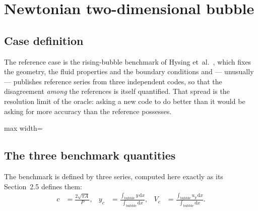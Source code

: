 \section{Newtonian two-dimensional bubble}\label{sec:newtonian}


\subsection{Case definition}

The reference case is the rising-bubble benchmark of Hysing
et~al.~, which fixes the geometry, the fluid properties and the
boundary conditions and --- unusually --- publishes reference series from three
independent codes, so that the disagreement \emph{among} the references is
itself quantified. That spread is the resolution limit of the oracle: asking a
new code to do better than it would be asking for more accuracy than the
reference possesses.

\begin{adjustbox}{max width=\linewidth}
\end{adjustbox}

\subsection{The three benchmark quantities}

The benchmark is defined by three series, computed here exactly as its
Section~2.5 defines them:
%
\begin{align}
  c  &= \frac{2\sqrt{\pi A}}{P}, &
  y_c &= \frac{\int_{\text{bubble}} y \,\mathrm{d}x}{\int_{\text{bubble}} \mathrm{d}x}, &
  V_c &= \frac{\int_{\text{bubble}} u_y \,\mathrm{d}x}{\int_{\text{bubble}} \mathrm{d}x} .
\end{align}

